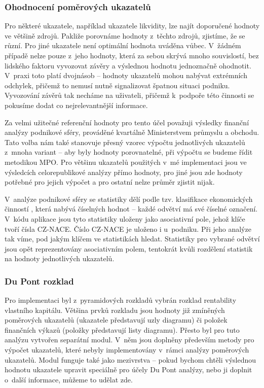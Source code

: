 \subsubsection{Ohodnocení poměrových ukazatelů}

Pro některé ukazatele, například ukazatele likvidity, lze najít doporučené hodnoty ve většině zdrojů. Pakliže porovnáme hodnoty z~těchto zdrojů, zjistíme, že se různí. Pro jiné ukazatele není optimální hodnota uváděna vůbec. V~žádném případě nelze pouze z~jeho hodnoty, která za sebou skrývá mnoho souvislostí, bez lidského faktoru vyvozovat závěry a výslednou hodnotu jednoznačně ohodnotit. V~praxi toto platí dvojnásob -- hodnoty ukazatelů mohou nabývat extrémních odchylek, přičemž to nemusí nutně signalizovat špatnou situaci podniku. Vyvozování závěrů tak necháme na uživateli, přičemž k~podpoře této činnosti se pokusíme dodat co nejrelevantnější informace.

Za velmi užitečné referenční hodnoty pro tento účel považuji výsledky finanční analýzy podnikové sféry, prováděné kvartálně Ministerstvem průmyslu a obchodu. Tato volba nám také stanovuje přesný vzorec výpočtu jednotlivých ukazatelů z~mnoha variant -- aby byly hodnoty porovnatelné, při výpočtu se budeme řídit metodikou MPO. Pro většinu ukazatelů použitých v~mé implementaci jsou ve výsledcích celorepublikové analýzy přímo hodnoty, pro jiné jsou zde hodnoty potřebné pro jejich výpočet a pro ostatní nelze průměr zjistit nijak.

V~analýze podnikové sféry se statistiky dělí podle tzv. klasifikace ekonomických činností , která nabývá číselných hodnot -- každé odvětví má své číselné označení. V~kódu aplikace jsou tyto statistiky uloženy jako asociativní pole, jehož klíče tvoří čísla CZ-NACE. Číslo CZ-NACE je uloženo i u~podniku. Při jeho analýze tak víme, pod jakým klíčem ve statistikách hledat. Statistiky pro vybrané odvětví jsou opět reprezentovány asociativním polem, tentokrát kvůli rozdělení statistik na hodnoty jednotlivých ukazatelů. 

\subsubsection{Du Pont rozklad}
Pro implementaci byl z~pyramidových rozkladů vybrán rozklad rentability vlastního kapitálu. Většina prvků rozkladu jsou hodnoty již zmíněných poměrových ukazatelů (ukazatele představují uzly diagramu) či položek finančních výkazů (položky představují listy diagramu). Přesto byl pro tuto analýzu vytvořen separátní modul. V~něm jsou doplněny především metody pro výpočet ukazatelů, které nebyly implementovány v~rámci analýzy poměrových ukazatelů. Modul funguje také jako mezivrstva -- pokud bychom chtěli výslednou hodnotu ukazatele upravit speciálně pro účely Du Pont analýzy, nebo ji doplnit o~další informace, můžeme to udělat zde. 

